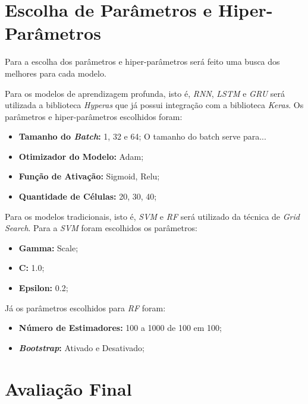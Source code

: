 \section{Escolha de Parâmetros e Hiper-Parâmetros}

Para a escolha dos parâmetros e hiper-parâmetros será feito uma busca dos melhores para cada modelo. 

Para os modelos de aprendizagem profunda, isto é, \textit{\acrshort{RNN}}, \textit{\acrshort{LSTM}} e \textit{\acrshort{GRU}} será utilizada a biblioteca \textit{Hyperas} que já possui integração com a biblioteca \textit{Keras}. Os parâmetros e hiper-parâmetros escolhidos foram:


\begin{itemize}
    \item \textbf{Tamanho do \textit{Batch}:} 1, 32 e 64; \newline
    O tamanho do batch serve para...
    \item \textbf{Otimizador do Modelo:} Adam;
    \item \textbf{Função de Ativação:} Sigmoid, Relu;
    \item \textbf{Quantidade de Células:} 20, 30, 40;
\end{itemize}

Para os modelos tradicionais, isto é, \textit{\acrshort{SVM}} e \textit{\acrshort{RF}} será utilizado da técnica de \textit{Grid Search}. Para a \textit{\acrshort{SVM}} foram escolhidos os parâmetros:

\begin{itemize}
    \item \textbf{Gamma:} Scale;
    \item \textbf{C:} 1.0;
    \item \textbf{Epsilon:} 0.2;
\end{itemize}

Já os parâmetros escolhidos para \textit{\acrshort{RF}} foram:

\begin{itemize}
    \item \textbf{Número de Estimadores:} 100 a 1000 de 100 em 100;
    \item \textbf{\textit{Bootstrap}:} Ativado e Desativado;
\end{itemize}

\section{Avaliação Final}

